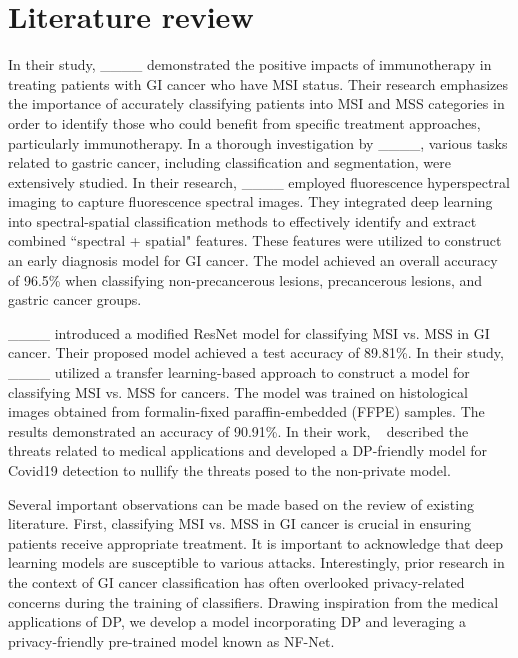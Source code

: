 \section{Literature review}
In their study, ____ demonstrated the positive impacts of immunotherapy in treating patients with GI cancer who have MSI status. Their research emphasizes the importance of accurately classifying patients into MSI and MSS categories in order to identify those who could benefit from specific treatment approaches, particularly immunotherapy. In a thorough investigation by ____, various tasks related to gastric cancer, including classification and segmentation, were extensively studied. In their research, ____ employed fluorescence hyperspectral imaging to capture fluorescence spectral images. They integrated deep learning into spectral-spatial classification methods to effectively identify and extract combined ``spectral + spatial" features. These features were utilized to construct an early diagnosis model for GI cancer. The model achieved an overall accuracy of 96.5\% when classifying non-precancerous lesions, precancerous lesions, and gastric cancer groups.

____ introduced a modified ResNet model for classifying MSI vs. MSS in GI cancer. Their proposed model achieved a test accuracy of 89.81\%. In their study, ____ utilized a transfer learning-based approach to construct a model for classifying MSI vs. MSS for cancers. The model was trained on histological images obtained from formalin-fixed paraffin-embedded (FFPE) samples. The results demonstrated an accuracy of 90.91\%. In their work, ~\cite {chilukoti2022privacy} described the threats related to medical applications and developed a DP-friendly model for Covid19 detection to nullify the threats posed to the non-private model.

Several important observations can be made based on the review of existing literature. First, classifying MSI vs. MSS in GI cancer is crucial in ensuring patients receive appropriate treatment. It is important to acknowledge that deep learning models are susceptible to various attacks. Interestingly, prior research in the context of GI cancer classification has often overlooked privacy-related concerns during the training of classifiers. Drawing inspiration from the medical applications of DP, we develop a model incorporating DP and leveraging a privacy-friendly pre-trained model known as NF-Net.